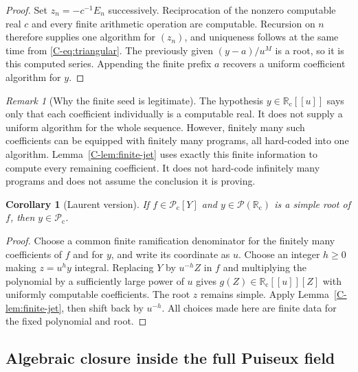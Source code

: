\documentclass[11pt,letterpaper]{article}
\numberwithin{equation}{section}
\newtheorem{corollary}[theorem]{Corollary}
\theoremstyle{definition}
\theoremstyle{remark}
\newtheorem{remark}[theorem]{Remark}
\newcommand{\PP}{\mathcal P}
\newcommand{\Rc}{\mathbb R_{\mathrm c}}
\newcommand{\Pc}{\mathcal P_{\mathrm c}}
\begin{document}
\begin{proof}
Set $z_n=-c^{-1}E_n$ successively. Reciprocation of the nonzero computable
real $c$ and every finite arithmetic operation are computable. Recursion on
$n$ therefore supplies one algorithm for $(z_n)$, and uniqueness follows at
the same time from \eqref{C-eq:triangular}. The previously given
$(y-a)/u^M$ is a root, so it is this computed series. Appending the finite
prefix $a$ recovers a uniform coefficient algorithm for $y$.
\end{proof}

\begin{remark}[Why the finite seed is legitimate]
The hypothesis $y\in\Rc[[u]]$ says only that each coefficient individually
is a computable real. It does not supply a uniform algorithm for the whole
sequence. However, finitely many such coefficients can be equipped with
finitely many programs, all hard-coded into one algorithm. Lemma~\ref{C-lem:finite-jet}
uses exactly this finite information to compute every remaining coefficient.
It does not hard-code infinitely many programs and does not assume the
conclusion it is proving.
\end{remark}

\begin{corollary}[Laurent version]
\label{C-cor:laurent-lift}
If $f\in\Pc[Y]$ and $y\in\PP(\Rc)$ is a simple root of $f$, then
$y\in\Pc$.
\end{corollary}
\begin{proof}
Choose a common finite ramification denominator for the finitely many
coefficients of $f$ and for $y$, and write its coordinate as $u$.
Choose an integer $h\geq0$ making $z=u^hy$ integral. Replacing $Y$ by
$u^{-h}Z$ in $f$ and multiplying the polynomial by a sufficiently large
power of $u$ gives $g(Z)\in\Rc[[u]][Z]$ with uniformly computable
coefficients. The root $z$ remains simple. Apply
Lemma~\ref{C-lem:finite-jet}, then shift back by $u^{-h}$.
All choices made here are finite data for the fixed polynomial and root.
\end{proof}

\subsection{Algebraic closure inside the full Puiseux field}
\end{document}
